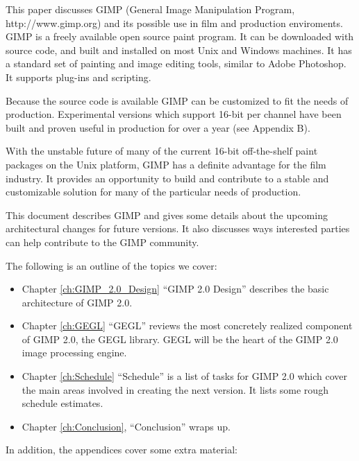 This paper discusses GIMP (General Image Manipulation Program,
http://www.gimp.org) and its possible use in film and production enviroments.
GIMP is a freely available open source paint program. It can be downloaded with
source code, and built and installed on most Unix and Windows machines.  It has
a standard set of painting and image editing tools, similar to Adobe Photoshop.
It supports plug-ins and scripting.

Because the source code is available GIMP can be customized to fit the needs of
production. Experimental versions which support 16-bit per channel have been
built and proven useful in production for over a year (see Appendix B).

With the unstable future of many of the current 16-bit off-the-shelf paint
packages on the Unix platform, GIMP has a definite advantage for the film
industry. It provides an opportunity to build and contribute to a stable and
customizable solution for many of the particular needs of production. 

This document describes GIMP and gives some details about the upcoming
architectural changes for future versions. It also discusses ways interested
parties can help contribute to the GIMP community.  

The following is an outline of the topics we cover:

\begin{itemize}

\item Chapter \ref{ch:GIMP_2.0_Design} ``GIMP 2.0 Design'' describes 
the basic architecture of GIMP 2.0.

\item Chapter \ref{ch:GEGL} ``GEGL'' reviews the most concretely realized 
component of GIMP 2.0, the GEGL library. GEGL will be the heart of
the GIMP 2.0 image processing engine.

\item Chapter \ref{ch:Schedule} ``Schedule'' is a list of tasks for GIMP 2.0 which
cover the main areas involved in creating the next version. It lists some rough schedule
estimates.  

\item Chapter \ref{ch:Conclusion}, ``Conclusion'' wraps up. 

\end{itemize}

In addition, the appendices cover some extra material:

